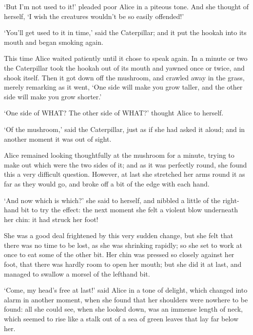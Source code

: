 \documentclass[12pt]{book}
\begin{document}
\begin{Parallel}[p]{}{}
{‘But I’m not used to it!’ pleaded poor Alice in a piteous tone. And she thought of herself, ‘I wish the creatures wouldn’t be so easily offended!’

‘You’ll get used to it in time,’ said the Caterpillar; and it put the hookah into its mouth and began smoking again.

This time Alice waited patiently until it chose to speak again. In a minute or two the Caterpillar took the hookah out of its mouth and yawned once or twice, and shook itself. Then it got down off the mushroom, and crawled away in the grass, merely remarking as it went, ‘One side will make you grow taller, and the other side will make you grow shorter.’

‘One side of WHAT? The other side of WHAT?’ thought Alice to herself.

‘Of the mushroom,’ said the Caterpillar, just as if she had asked it aloud; and in another moment it was out of sight.

Alice remained looking thoughtfully at the mushroom for a minute, trying to make out which were the two sides of it; and as it was perfectly round, she found this a very difficult question. However, at last she stretched her arms round it as far as they would go, and broke off a bit of the edge with each hand.

‘And now which is which?’ she said to herself, and nibbled a little of the right-hand bit to try the effect: the next moment she felt a violent blow underneath her chin: it had struck her foot!

She was a good deal frightened by this very sudden change, but she felt that there was no time to be lost, as she was shrinking rapidly; so she set to work at once to eat some of the other bit. Her chin was pressed so closely against her foot, that there was hardly room to open her mouth; but she did it at last, and managed to swallow a morsel of the lefthand bit.


\begin{center}
\quad*\quad*\quad*\quad*\quad*\quad*\quad*
\par
\quad*\quad*\quad*\quad*\quad*\quad*
\par
\quad*\quad*\quad*\quad*\quad*\quad*\quad*
\end{center}

‘Come, my head’s free at last!’ said Alice in a tone of delight, which changed into alarm in another moment, when she found that her shoulders were nowhere to be found: all she could see, when she looked down, was an immense length of neck, which seemed to rise like a stalk out of a sea of green leaves that lay far below her.

}
\end{Parallel}
\end{document}

